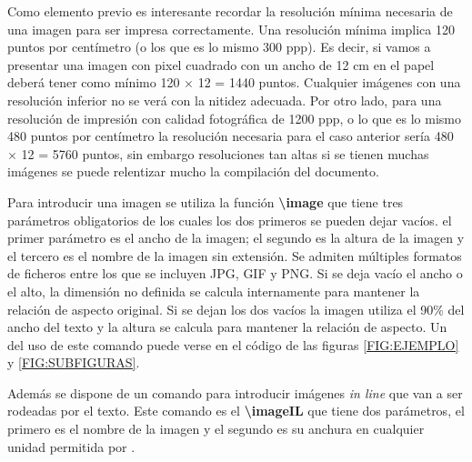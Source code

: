   Como elemento previo es interesante recordar la resolución mínima necesaria de una imagen para ser impresa correctamente. Una resolución mínima implica 120 puntos por centímetro (o los que es lo mismo 300 ppp). Es decir, si vamos a presentar una imagen con pixel cuadrado con un ancho de 12 cm en el papel deberá tener como mínimo 120 $\times$ 12 = 1440 puntos. Cualquier imágenes con una resolución inferior no se verá con la nitidez adecuada. Por otro lado, para una resolución de impresión con calidad fotográfica de 1200 ppp, o lo que es lo mismo 480 puntos por centímetro la resolución necesaria para el caso anterior sería 480 $\times$ 12 = 5760 puntos, sin embargo resoluciones tan altas si se tienen muchas imágenes se puede relentizar mucho la compilación del documento.

 	Para introducir una imagen se utiliza la función \textbf{{\textbackslash}image} que tiene tres parámetros obligatorios de los cuales los dos primeros se pueden dejar vacíos. el primer parámetro es el ancho de la imagen; el segundo es la altura de la imagen y el tercero es el nombre de la imagen sin extensión. Se admiten múltiples formatos de ficheros entre los que se incluyen JPG, GIF y PNG. Si se deja vacío el ancho o el alto, la dimensión no definida se calcula internamente para mantener la relación de aspecto original. Si se dejan los dos vacíos la imagen utiliza el 90\% del ancho del texto y la altura se calcula para mantener la relación de aspecto. Un del uso de este comando puede verse en el código de las figuras \ref{FIG:EJEMPLO} y \ref{FIG:SUBFIGURAS}.

  Además se dispone de un comando para introducir imágenes \textit{in line} que van a ser rodeadas por el texto. Este comando es el \textbf{{\textbackslash}imageIL} que tiene dos parámetros, el primero es el nombre de la imagen y el segundo es su anchura en cualquier unidad permitida por \LaTeXe.
